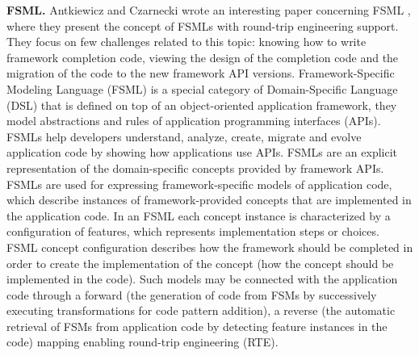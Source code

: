 \textbf{FSML.} Antkiewicz and Czarnecki wrote an interesting paper concerning FSML \cite{FSML}, where they present the concept of FSMLs with round-trip engineering support. They focus on few challenges related to this topic: knowing how to write framework completion code, viewing the design of the completion code and the migration of the code to the new framework API versions. Framework-Specific Modeling Language (FSML) is a special category of Domain-Specific Language (DSL) that is defined on top of an object-oriented application framework, they model abstractions and rules of application programming interfaces (APIs). FSMLs help developers understand, analyze, create, migrate and evolve application code by showing how applications use APIs. FSMLs are an explicit representation of the domain-specific concepts provided by framework APIs. FSMLs are used for expressing framework-specific models of application code, which describe instances of framework-provided concepts that are implemented in the application code. In an FSML each concept instance is characterized by a configuration of features, which represents implementation steps or choices. FSML concept configuration describes how the framework should be completed in order to create the implementation of the concept (how the concept should be implemented in the code). Such models may be connected with the application code through a forward (the generation of code from FSMs by successively executing transformations for code pattern addition), a reverse (the automatic retrieval of FSMs from application code by detecting feature instances in the code) mapping enabling round-trip engineering (RTE).

